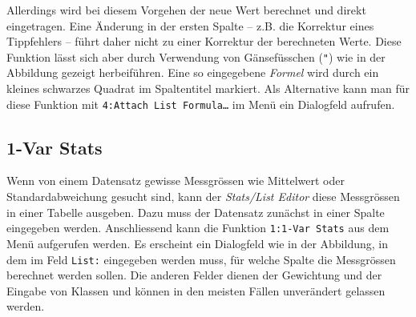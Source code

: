 \documentclass[a4paper,11pt,notitlepage,halfparskip,headsepline,normalheadings,twoside]{scrartcl}
\newlength{\tikey}
\newcommand{\keystroke}[1]{\settowidth{\tikey}{\scriptsize #1}\psframebox[framearc=0.2]{\parbox{\tikey}{\scriptsize\textsf{#1}}}}
\begin{document}
\begin{window}
Allerdings wird bei diesem Vorgehen der neue Wert berechnet und direkt
eingetragen. Eine Änderung in der ersten Spalte -- z.B. die Korrektur eines
Tippfehlers -- führt daher nicht zu einer Korrektur der berechneten Werte. Diese
Funktion lässt sich aber durch Verwendung von Gänsefüsschen (\texttt{"}) 
wie in der Abbildung gezeigt herbeiführen. Eine so eingegebene \textit{Formel}
wird durch ein kleines schwarzes Quadrat im Spaltentitel markiert. Als
Alternative kann man für diese Funktion mit \texttt{4:Attach List Formula\ldots}
im Menü \keystroke{F3} ein Dialogfeld aufrufen.
\end{window}

\subsection{1-Var Stats}
\begin{window}
Wenn von einem Datensatz gewisse Messgrössen wie Mittelwert oder
Standardabweichung gesucht sind, kann der \textit{Stats/List Editor} diese
Messgrössen in einer Tabelle ausgeben. Dazu muss der Datensatz zunächst in einer
Spalte eingegeben werden. Anschliessend kann die Funktion \texttt{1:1-Var Stats}
aus dem Menü \keystroke{F4} aufgerufen werden. Es erscheint ein Dialogfeld wie
in der Abbildung, in dem im Feld \texttt{List:} eingegeben werden muss, für
welche Spalte die Messgrössen berechnet werden sollen. Die anderen Felder dienen
der Gewichtung und der Eingabe von Klassen und können in den meisten Fällen
unverändert gelassen werden.
\end{window}
\end{document}
